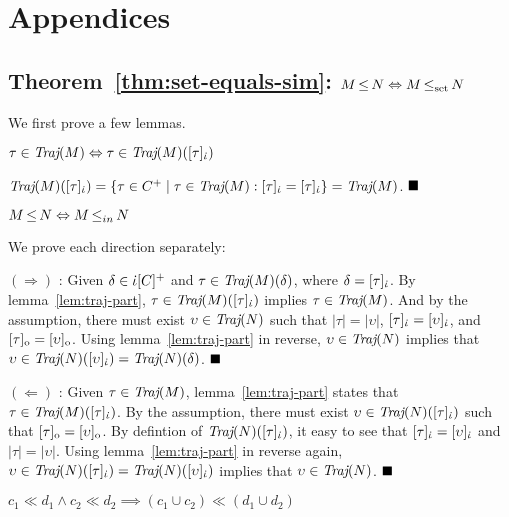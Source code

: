 \section{Appendices}

\subsection{Theorem~\ref{thm:set-equals-sim}: $M \operatorname{\leq} N \Leftrightarrow M \operatorname{\operatorname{\leq}_{\textrm{set}}} N$}

We first prove a few lemmas.

\begin{lemma} \label{lem:traj-part}
$\tau \in \operatorname{\textit{Traj}}(M) \Leftrightarrow \tau \in \operatorname{\textit{Traj}}(M)([\tau]_{\dot{\iota}})$
\end{lemma}

$\operatorname{\textit{Traj}}(M)([\tau]_{\dot{\iota}}) = \{ \tau \in C^{+} \mid \tau \in \operatorname{\textit{Traj}}(M) : [\tau]_{\dot{\iota}} = [\tau]_{\dot{\iota}} \} = \operatorname{\textit{Traj}}(M)$. $\Qed$

\begin{lemma} \label{lem:ref-iff-in}
$M \operatorname{\leq} N \Leftrightarrow M \operatorname{\leq}_{in} N$
\end{lemma}

We prove each direction separately:

$(\Rightarrow)$ : Given $\delta \in \dot{\iota}[C]^{+}$ and $\tau \in \operatorname{\textit{Traj}}(M)(\delta)$, where $\delta = [\tau]_{\dot{\iota}}$. By lemma~\ref{lem:traj-part}, $\tau \in \operatorname{\textit{Traj}}(M)([\tau]_{\dot{\iota}})$ implies $\tau \in \operatorname{\textit{Traj}}(M)$. And by the assumption, there must exist $\upsilon \in \operatorname{\textit{Traj}}(N)$ such that $| \tau | = | \upsilon |$, $[\tau]_{\dot{\iota}} = [\upsilon]_{\dot{\iota}}$, and $[\tau]_{\mathrm{o}} = [\upsilon]_{\mathrm{o}}$. Using lemma~\ref{lem:traj-part} in reverse, $\upsilon \in \operatorname{\textit{Traj}}(N)$ implies that $\upsilon \in \operatorname{\textit{Traj}}(N)([\upsilon]_{\dot{\iota}}) = \operatorname{\textit{Traj}}(N)(\delta)$. $\Qed$

$(\Leftarrow)$ : Given $\tau \in \operatorname{\textit{Traj}}(M)$, lemma~\ref{lem:traj-part} states that $\tau \in \operatorname{\textit{Traj}}(M)([\tau]_{\dot{\iota}})$. By the assumption, there must exist $\upsilon \in \operatorname{\textit{Traj}}(N)([\tau]_{\dot{\iota}})$ such that $[\tau]_{\mathrm{o}} = [\upsilon]_{\mathrm{o}}$. By defintion of $\operatorname{\textit{Traj}}(N)([\tau]_{\dot{\iota}})$, it easy to see that $[\tau]_{\dot{\iota}} = [\upsilon]_{\dot{\iota}}$ and $| \tau | = | \upsilon |$. Using lemma~\ref{lem:traj-part} in reverse again, $\upsilon \in \operatorname{\textit{Traj}}(N)([\tau]_{\dot{\iota}}) = \operatorname{\textit{Traj}}(N)([\upsilon]_{\dot{\iota}})$ implies that $\upsilon \in \operatorname{\textit{Traj}}(N)$. $\Qed$

\begin{lemma} \label{lem:cl-union}
$c_{1} \ll d_{1} \wedge c_{2} \ll d_{2} \implies (c_{1} \cup c_{2}) \ll (d_{1} \cup d_{2})$
\end{lemma}

